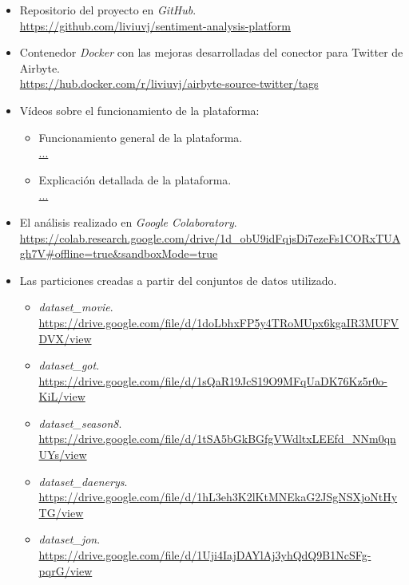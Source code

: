 \begin{itemize}
    \item Repositorio del proyecto en \textit{GitHub}.\\
        \url{https://github.com/liviuvj/sentiment-analysis-platform}
    
    \item Contenedor \textit{Docker} con las mejoras desarrolladas del conector para Twitter de  Airbyte.\\
        \url{https://hub.docker.com/r/liviuvj/airbyte-source-twitter/tags}

    \item Vídeos sobre el funcionamiento de la plataforma:
    \begin{itemize}
        \item Funcionamiento general de la plataforma.\\
            \url{...}
        \item Explicación detallada de la plataforma.\\
            \url{...}
    \end{itemize}

    \item El análisis realizado en \textit{Google Colaboratory}.\\
        \url{https://colab.research.google.com/drive/1d_obU9idFqjsDi7ezeFs1CORxTUAgh7V#offline=true&sandboxMode=true}

    \item Las particiones creadas a partir del conjuntos de datos utilizado.
    \begin{itemize}
        \item \textit{dataset\_movie}.\\
            \url{https://drive.google.com/file/d/1doLbhxFP5y4TRoMUpx6kgaIR3MUFVDVX/view}
        \item \textit{dataset\_got}.\\
            \url{https://drive.google.com/file/d/1sQaR19JcS19O9MFqUaDK76Kz5r0o-KiL/view}
        \item \textit{dataset\_season8}.\\
            \url{https://drive.google.com/file/d/1tSA5bGkBGfgVWdltxLEEfd_NNm0qnUYs/view}
        \item \textit{dataset\_daenerys}.\\
            \url{https://drive.google.com/file/d/1hL3eh3K2lKtMNEkaG2JSgNSXjoNtHyTG/view}
        \item \textit{dataset\_jon}.\\
            \url{https://drive.google.com/file/d/1Uji4IajDAYlAj3yhQdQ9B1NcSFg-pqrG/view}
    \end{itemize}
    
\end{itemize}

